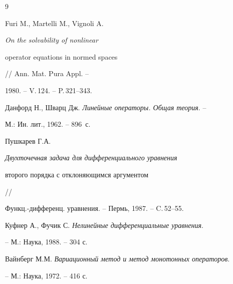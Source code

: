 \begin{thebibliography}{9}







Furi M., Martelli M., Vignoli A. {\em On the solvability of nonlinear 


operator equations in normed spaces} // Ann. Mat. Pura Appl. --


1980. -- V.\,124. -- P.\,321--343.




Данфорд Н., Шварц Дж. {\em Линейные операторы. Общая теория}. --


М.: Ин. лит., 1962. -- 896~с.




Пушкарев Г.А. {\em Двухточечная задача для дифференциального уравнения 


второго порядка с отклоняющимся аргументом} //


Функц.-дифференц. уравнения. -- Пермь, 1987. -- C.\,52--55.




Куфнер А., Фучик С. {\em Нелинейные дифференциальные уравнения}.


-- М.: Наука, 1988. -- 304 с.




Вайнберг М.М. {\em Вариационный метод и метод монотонных операторов}.


-- М.: Наука, 1972. -- 416 с.





\end{thebibliography}





\vskip 0.5cm












\label{end}








